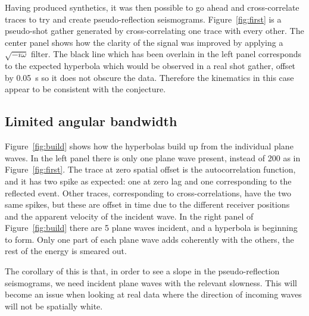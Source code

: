 Having produced synthetics, it was then possible to go ahead and 
cross-correlate traces to try and create pseudo-reflection seismograms. 
Figure~\ref{fig:first} is a pseudo-shot gather generated 
by cross-correlating one trace with every other.  The center panel shows how 
the clarity of the signal 
was improved by applying a $\sqrt{-i\omega}$ filter. 
The black line which has been overlain in the left panel 
corresponds to the expected hyperbola which would be observed in a real
shot gather, offset by 0.05~s so it does not obscure the data.
Therefore the kinematics in this case appear to be consistent 
with the conjecture.


\subsection{Limited angular bandwidth}

Figure~\ref{fig:build} shows how the hyperbolas build up 
from the individual plane waves. In the left panel there is only
one plane wave present, instead of 200 as in Figure~\ref{fig:first}.  
The trace at zero spatial offset is the autocorrelation 
function, and it has two spike as expected: 
one at zero lag and one corresponding to the reflected event. 
Other traces, corresponding to cross-correlations, have the two same 
spikes, but these are offset in time due to the different 
receiver positions and the apparent velocity of the incident wave.
In the right panel of Figure~\ref{fig:build} there are 5 plane waves incident, 
and a hyperbola is beginning to form.
Only one part of each plane wave adds coherently with the others, the rest 
of the energy is smeared out. 

The corollary of this is that, in order to see a slope in the pseudo-reflection
seismograms, we need incident plane waves with the relevant slowness.
This will become an issue when looking at real data where the direction of
incoming waves will not be spatially white.


